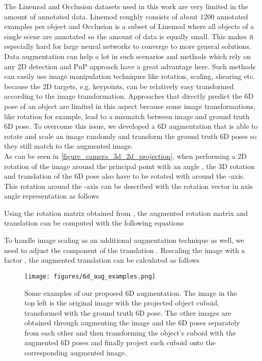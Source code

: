 \documentclass[twocolumn, 10pt, letterpaper]{article}
\begin{document}
The Linemod\cite{Linemod} and Occlusion\cite{Occlusion} datasets used in this work are very limited in the amount of annotated data. Linemod roughly consists of about 1200 annotated examples per object and Occlusion is a subset of Linemod where all objects of a single scene are annotated so the amount of data is equally small. This makes it especially hard for large neural networks to converge to more general solutions. Data augmentation can help a lot in such scenarios\cite{RandAugment}\cite{AmoebaNet_NAS_FPN} and methods which rely on any 2D detection and PnP approach have a great advantage here. Such methods can easily use image manipulation techniques like rotation, scaling, shearing etc. because the 2D targets, e.g. keypoints, can be relatively easy transformed according to the image transformation. Approaches that directly predict the 6D pose of an object are limited in this aspect because some image transformations, like rotation for example, lead to a mismatch between image and ground truth 6D pose. To overcome this issue, we developed a 6D augmentation that is able to rotate and scale an image randomly and transform the ground truth 6D poses so they still match to the augmented image.\\
As can be seen in \autoref{figure_camera_3d_2d_projection}, when performing a 2D rotation of the image around the principal point with an angle , the 3D rotation  and translation  of the 6D pose also have to be rotated with  around the -axis. This rotation around the -axis can be described with the rotation vector  in axis angle representation as follows

Using the rotation matrix  obtained from , the augmented rotation matrix  and translation  can be computed with the following equations




To handle image scaling as an additional augmentation technique as well, we need to adjust the  component of the translation . Rescaling the image with a factor , the augmented translation  can be calculated as follows


\begin{figure}
\texttt{[image: figures/6d\_aug\_examples.png]}
\caption{Some examples of our proposed 6D augmentation. The image in the top left is the original image with the projected object cuboid, transformed with the ground truth 6D pose. The other images are obtained through augmenting the image and the 6D poses separately from each other and then transforming the object's cuboid with the augmented 6D poses and finally project each cuboid onto the corresponding augmented image.}
\label{figure_6d_aug_examples}
\end{figure}
\end{document}
